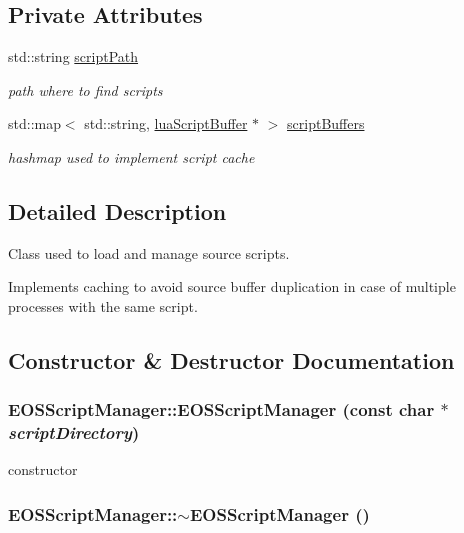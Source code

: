 \subsection*{Private Attributes}
\begin{CompactItemize}
\item 
std::string \hyperlink{classEOSScriptManager_dced2289218a857f35fa61bcf01f728e}{scriptPath}
\begin{CompactList}\small\item\em path where to find scripts \item\end{CompactList}\item 
std::map$<$ std::string, \hyperlink{structluaScriptBuffer}{luaScriptBuffer} $\ast$ $>$ \hyperlink{classEOSScriptManager_5cb3f437eb3fbc6d770a978124fda515}{scriptBuffers}
\begin{CompactList}\small\item\em hashmap used to implement script cache \item\end{CompactList}\end{CompactItemize}


\subsection{Detailed Description}
Class used to load and manage source scripts. 

Implements caching to avoid source buffer duplication in case of multiple processes with the same script. 

\subsection{Constructor \& Destructor Documentation}
\hypertarget{classEOSScriptManager_815c5c06c48751e49450d5f7e9408edb}{
\subsubsection[{EOSScriptManager}]{\setlength{\rightskip}{0pt plus 5cm}EOSScriptManager::EOSScriptManager (const char $\ast$ {\em scriptDirectory})}}
\label{classEOSScriptManager_815c5c06c48751e49450d5f7e9408edb}


constructor 

\hypertarget{classEOSScriptManager_8e394b82ab8ee05aaa41d3cb46938486}{
\subsubsection[{$\sim$EOSScriptManager}]{\setlength{\rightskip}{0pt plus 5cm}EOSScriptManager::$\sim$EOSScriptManager ()}}
\label{classEOSScriptManager_8e394b82ab8ee05aaa41d3cb46938486}


